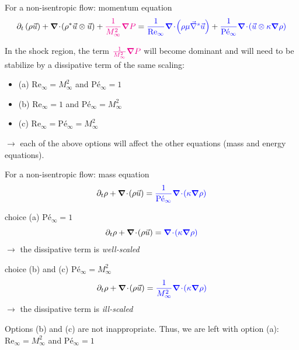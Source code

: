 \documentclass[xcolor=dvipsnames,10pt]{beamer}
\renewcommand{\Re}{\textrm{Re}}
\newcommand{\Pe}{\textrm{P\'e}}
\renewcommand{\div}{\boldsymbol{\nabla}\! \cdot \!}
\newcommand{\grad}{\boldsymbol{\nabla}}
\newcommand{\gradd}[1]{\vec{\nabla}^{#1}}
\begin{document}
\begin{frame}{For a non-isentropic flow: momentum equation}
\begin{align}
\partial_{t} \left( \rho \vec{u} \right) 
+ \div \left( \rho^* \vec{u}\otimes \vec{u} \right) 
+ \textcolor{magenta}{\frac{1}{M_\infty^2}\grad  P}  
= 
\textcolor{blue}{\frac{1}{\Re_\infty} \div \left( \rho \mu \gradd{s} \vec{u} \right)} +
\textcolor{blue}{\frac{1}{\Pe_\infty} \div \left(\vec{u}\otimes \kappa \grad  \rho \right)} \nonumber
\end{align}
\begin{block}{}
In the shock region, the term $\textcolor{magenta}{\frac{1}{M_\infty^2}\grad  P}  $ will become dominant and will need to be stabilize by a dissipative term of the same scaling:
\begin{itemize}
\setlength{\itemsep}{10pt}
\item (a) $\Re_\infty = M_\infty^2$ and $\Pe_\infty = 1$
\item (b) $\Re_\infty = 1$ and $\Pe_\infty = M_\infty^2$
\item (c) $\Re_\infty = \Pe_\infty = M_\infty^2$
\end{itemize}
$\longrightarrow$ each of the above options will affect the other equations (mass and energy equations).
\end{block}
\end{frame}
\begin{frame}{For a non-isentropic flow: mass equation}
\begin{equation}
\partial_{t} \rho+ \div  \left(  \rho \vec{u}  \right) = \textcolor{blue}{\frac{1}{\Pe_\infty} \div  ( \kappa \grad \rho )} \nonumber
\end{equation}
\begin{block}{choice (a) $\Pe_\infty = 1$}
\begin{equation}
\partial_{t} \rho+ \div  \left(  \rho \vec{u}  \right) = \textcolor{blue}{\div  ( \kappa \grad \rho )} \nonumber
\end{equation}
$\to$ the dissipative term is \emph{well-scaled}
\end{block}
\begin{block}{choice (b) and (c) $\Pe_\infty = M_\infty^2$}
\begin{equation}
\partial_{t} \rho+ \div  \left(  \rho \vec{u}  \right) = \textcolor{blue}{\frac{1}{M_\infty^2} \div  ( \kappa \grad \rho )} \nonumber
\end{equation}
$\to$ the dissipative term is \emph{ill-scaled}
\end{block}
Options (b) and (c) are not inappropriate. Thus, we are left with option (a): $\Re_\infty = M_\infty^2$ and $\Pe_\infty = 1$
\end{frame}
\end{document}

